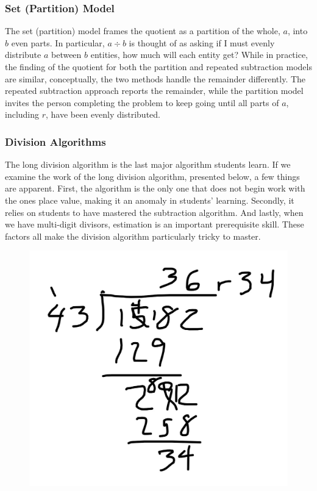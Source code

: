 \documentclass[
]{book}
\theoremstyle{definition}
\theoremstyle{definition}
\theoremstyle{definition}
\theoremstyle{definition}
\theoremstyle{remark}
\begin{document}
\hypertarget{set-partition-model}{%
\subsubsection*{Set (Partition) Model}\label{set-partition-model}}

The set (partition) model frames the quotient as a partition of the whole, \(a\), into \(b\) even parts. In particular, \(a\div b\) is thought of as asking if I must evenly distribute \(a\) between \(b\) entities, how much will each entity get? While in practice, the finding of the quotient for both the partition and repeated subtraction models are similar, conceptually, the two methods handle the remainder differently. The repeated subtraction approach reports the remainder, while the partition model invites the person completing the problem to keep going until all parts of \(a\), including \(r\), have been evenly distributed.

\hypertarget{division-algorithms}{%
\subsubsection{Division Algorithms}\label{division-algorithms}}

The long division algorithm is the last major algorithm students learn. If we examine the work of the long division algorithm, presented below, a few things are apparent.
First, the algorithm is the only one that does not begin work with the ones place value, making it an anomaly in students' learning. Secondly, it relies on students to have mastered the subtraction algorithm. And lastly, when we have multi-digit divisors, estimation is an important prerequisite skill. These factors all make the division algorithm particularly tricky to master.

\begin{figure}

{\centering \includegraphics[width=0.6\linewidth]{images/Long_division} 

}

\end{figure}
\end{document}
